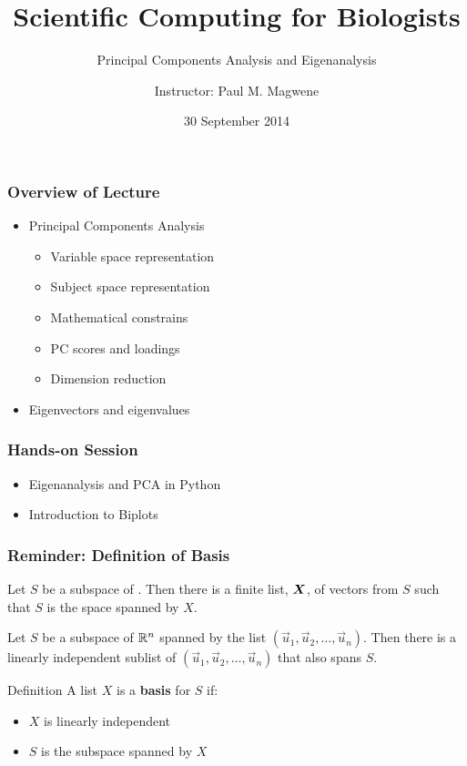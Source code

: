 \documentclass{beamer}
\title{Scientific Computing for Biologists}
\subtitle{Principal Components Analysis and Eigenanalysis} %
\author{Instructor: Paul M. Magwene}
\date{30 September 2014}
\begin{document}
\begin{frame}
\titlepage
\end{frame}

\begin{frame}
  \frametitle{Overview of Lecture}
  
\begin{itemize}
		\item Principal Components Analysis
		\begin{itemize}
			\item Variable space representation
			\item Subject space representation
			\item Mathematical constrains
			\item PC scores and loadings
			\item Dimension reduction			
		\end{itemize}		
		\item Eigenvectors and eigenvalues	
\end{itemize}

\end{frame}

\begin{frame}
  \frametitle{Hands-on Session}
\begin{itemize}
    \item Eigenanalysis and PCA in Python
    \item Introduction to Biplots
\end{itemize} 


\end{frame}		




\begin{frame}
  \frametitle{Reminder: Definition of Basis}

Let $S$ be a subspace of \RealN.  Then there is a finite list, $\bm{X}$, of vectors from $S$ such that $S$ is the space spanned by $X$.
\medskip

Let $S$ be a subspace of $\mathbb{R}^n$ spanned by the list $(\vec{u}_1, \vec{u}_2, \ldots, \vec{u}_n)$. Then  there is a linearly independent sublist of $(\vec{u}_1, \vec{u}_2, \ldots, \vec{u}_n)$ that also spans $S$.
\medskip

\begin{block}{Definition}
A list $X$ is a \textbf{basis} for $S$ if:
\begin{itemize}
\item $X$ is linearly independent
\item $S$ is the subspace spanned by $X$
\end{itemize}
\end{block}

\end{frame}
\end{document}
